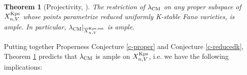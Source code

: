 \documentclass[12pt,reqno]{amsart}%
\newtheorem{thm}{Theorem}[section]
\theoremstyle{definition}
\theoremstyle{remark}
\begin{document}
\begin{thm}[{Projectivity, \cites{CP18,XZ19}}]\label{t-positivity} The restriction of $\lambda_{\rm CM}$ on any proper subspace of $X^{\rm Kps}_{n,V}$ whose points parametrize reduced uniformly K-stable Fano varieties, is ample. In particular,  $\lambda_{\rm CM}|_{\overline{X}^{\rm Kps, sm}_{n,V}}$ is ample. 
\end{thm}


Putting together  Properness Conjecture \ref{c-proper} and Conjecture \ref{c-reducedk}, Theorem \ref{t-positivity} predicts that $\lambda_{\rm CM}$ is ample on $X^{\rm Kps}_{n,V}$, i.e. we have
the following implications:

{\small

}
\end{document}
